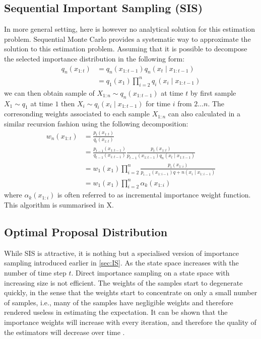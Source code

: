 \subsection{Sequential Important Sampling (SIS)}
In more general setting, here is however no analytical solution for this estimation problem. Sequential Monte Carlo provides a systematic way to approximate the solution to this estimation problem. Assuming that it is possible to decompose the selected importance distribution in the following form:
\begin{align}
	q_n(x_{1:t}) &= q_n(x_{1:t-1}) q_n(x_t \mid x_{1:t-1}) \nonumber \\
	             &= q_1(x_1) \prod^n_{i=2} q_i(x_i \mid x_{1:t-1})
\end{align}
we can then obtain sample of ${X_{1:n}} \sim q_n(x_{1:t-1})$ at time $t$ by first sample $X_1 \sim q_1$ at time $1$ then $X_i \sim q_i(x_i \mid x_{1:t-1})$ for time $i$ from $2 \ldots n$. The corresonding weights associated to each sample $X_{1:n}$ can also calculated in a similar recursion fashion using the following decomposition:
\begin{align}
  w_n(x_{1:t}) &= \frac{p_t(x_{1:t})}{q_t(x_{1:t})} \nonumber \\
               &= \frac{p_{t-1}(x_{1:t-1})}{q_{t-1}(x_{1:t-1})} \frac{p_t(x_{1:t})}{p_{t-1}(x_{1:t-1})q_n(x_t \mid x_{1:t-1})} \label{eq:w} \\
  &= w_1(x_1) \prod^n_{i=2} \frac{p_i(x_{1:i})}{p_{i-1}(x_{1:i-1})q+n(x_i \mid x_{1:i-1})} \nonumber \\
  &= w_1(x_1) \prod^n_{i=2} \alpha_k(x_{1:i})
\end{align}
where $\alpha_k(x_{1:i})$  is often referred to as incremental importance weight function. This algorithm is summarised in X.

\subsection{Optimal Proposal Distribution}
While SIS is attractive, it is nothing but a specialised version of importance sampling introduced earlier in \ref{sec:IS}. As the state space increases with the number of time step $t$. Direct importance sampling on a state space with increasing size is not efficient. The weights of the samples start to degenerate quickly, in the sense that the weights start to concentrate on only a small number of samples, i.e., many of the samples have negligible weights and therefore rendered useless in estimating the expectation. It can be shown that the importance weights will increase with every iteration, and therefore the quality of the estimators will decrease over time \cite{}. 


